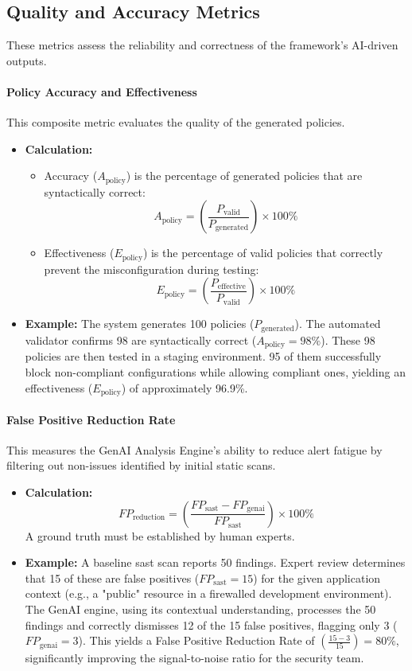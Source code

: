 \subsection*{Quality and Accuracy Metrics}
These metrics assess the reliability and correctness of the framework's AI-driven outputs.

\paragraph{Policy Accuracy and Effectiveness} This composite metric evaluates the quality of the generated policies.
\begin{itemize}
    \item \textbf{Calculation:}
        \begin{itemize}
            \item Accuracy (\( A_{\text{policy}} \)) is the percentage of generated policies that are syntactically correct:
            \[ A_{\text{policy}} = \left(\frac{P_{\text{valid}}}{P_{\text{generated}}}\right) \times 100\% \]
            \item Effectiveness (\( E_{\text{policy}} \)) is the percentage of valid policies that correctly prevent the misconfiguration during testing:
            \[ E_{\text{policy}} = \left(\frac{P_{\text{effective}}}{P_{\text{valid}}}\right) \times 100\% \]
        \end{itemize}
    \item \textbf{Example:} The system generates 100 policies (\( P_{\text{generated}} \)). The automated validator confirms 98 are syntactically correct (\( A_{\text{policy}} = 98\% \)). These 98 policies are then tested in a staging environment. 95 of them successfully block non-compliant configurations while allowing compliant ones, yielding an effectiveness (\( E_{\text{policy}} \)) of approximately 96.9\%.
\end{itemize}

\paragraph{False Positive Reduction Rate} This measures the GenAI Analysis Engine's ability to reduce alert fatigue by filtering out non-issues identified by initial static scans.
\begin{itemize}
    \item \textbf{Calculation:} \[ FP_{\text{reduction}} = \left(\frac{FP_{\text{sast}} - FP_{\text{genai}}}{FP_{\text{sast}}}\right) \times 100\% \] A ground truth must be established by human experts.
    \item \textbf{Example:} A baseline \gls{sast} scan reports 50 findings. Expert review determines that 15 of these are false positives (\( FP_{\text{sast}} = 15 \)) for the given application context (e.g., a "public" resource in a firewalled development environment). The GenAI engine, using its contextual understanding, processes the 50 findings and correctly dismisses 12 of the 15 false positives, flagging only 3 (\( FP_{\text{genai}} = 3 \)). This yields a False Positive Reduction Rate of \( \left(\frac{15 - 3}{15}\right) = 80\% \), significantly improving the signal-to-noise ratio for the security team.
\end{itemize}

